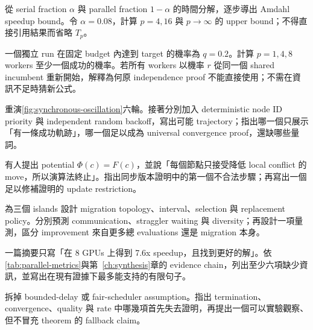 \documentclass[11pt,a4paper,oneside,openany]{book}
\begin{document}
\begin{exercise}
從 serial fraction $\alpha$ 與 parallel fraction $1-\alpha$ 的時間分解，逐步導出 Amdahl speedup bound。令 $\alpha=0.08$，計算 $p=4,16$ 與 $p\to\infty$ 的 upper bound；不得直接引用結果而省略 $T_p$。
\end{exercise}

\begin{exercise}
一個獨立 run 在固定 budget 內達到 target 的機率為 $q=0.2$。計算 $p=1,4,8$ workers 至少一個成功的機率。若所有 workers 以機率 $r$ 從同一個 shared incumbent 重新開始，解釋為何原 independence proof 不能直接使用；不需在資訊不足時猜新公式。
\end{exercise}

\begin{exercise}
重演\cref{fig:synchronous-oscillation}六輪。接著分別加入 deterministic node ID priority 與 independent random backoff，寫出可能 trajectory；指出哪一個只展示「有一條成功軌跡」，哪一個足以成為 universal convergence proof，還缺哪些量詞。
\end{exercise}

\begin{exercise}
有人提出 potential $\Phi(c)=F(c)$，並說「每個節點只接受降低 local conflict 的 move，所以演算法終止」。指出同步版本證明中的第一個不合法步驟；再寫出一個足以修補證明的 update restriction。
\end{exercise}

\begin{exercise}
為三個 islands 設計 migration topology、interval、selection 與 replacement policy。分別預測 communication、straggler waiting 與 diversity；再設計一項量測，區分 improvement 來自更多總 evaluations 還是 migration 本身。
\end{exercise}

\begin{exercise}
一篇摘要只寫「在 8 GPUs 上得到 7.6x speedup，且找到更好的解」。依\cref{tab:parallel-metrics}與第~\ref{ch:synthesis}章的 evidence chain，列出至少六項缺少資訊，並寫出在現有證據下最多能支持的有限句子。
\end{exercise}

\begin{exercise}
拆掉 bounded-delay 或 fair-scheduler assumption。指出 termination、convergence、quality 與 rate 中哪幾項首先失去證明，再提出一個可以實驗觀察、但不冒充 theorem 的 fallback claim。
\end{exercise}
\end{document}
